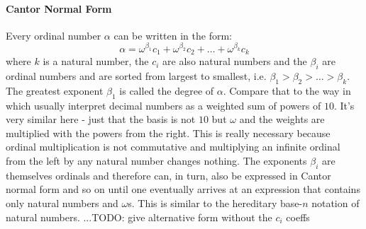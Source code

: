 \paragraph{Cantor Normal Form}
Every ordinal number $\alpha$ can be written in the form:
\begin{equation}
\alpha = \omega^{\beta_1} c_1 + \omega^{\beta_2} c_2 + \ldots + \omega^{\beta_k} c_k
\end{equation}
where $k$ is a natural number, the $c_i$ are also natural numbers and the $\beta_i$ are ordinal numbers and are sorted from largest to smallest, i.e. $\beta_1 > \beta_2 > \ldots > \beta_k$. The greatest exponent $\beta_1$ is called the degree of $\alpha$. Compare that to the way in which usually interpret decimal numbers as a weighted sum of powers of $10$. It's very similar here - just that the basis is not $10$ but $\omega$ and the weights are multiplied with the powers from the right. This is really necessary because ordinal multiplication is not commutative and multiplying an infinite ordinal from the left by any natural number changes nothing. The exponents $\beta_i$ are themselves ordinals and therefore can, in turn, also be expressed in Cantor normal form and so on until one eventually arrives at an expression that contains only natural numbers and $\omega$s. This is similar to the hereditary base-$n$ notation of natural numbers. ...TODO: give alternative form without the $c_i$ coeffs








